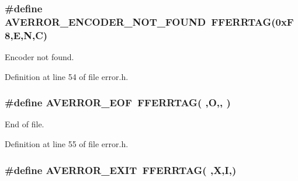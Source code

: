 \subsubsection[{\texorpdfstring{A\+V\+E\+R\+R\+O\+R\+\_\+\+E\+N\+C\+O\+D\+E\+R\+\_\+\+N\+O\+T\+\_\+\+F\+O\+U\+ND}{AVERROR_ENCODER_NOT_FOUND}}]{\setlength{\rightskip}{0pt plus 5cm}\#define A\+V\+E\+R\+R\+O\+R\+\_\+\+E\+N\+C\+O\+D\+E\+R\+\_\+\+N\+O\+T\+\_\+\+F\+O\+U\+ND~{\bf F\+F\+E\+R\+R\+T\+AG}(0x\+F8,\textquotesingle{}\+E\textquotesingle{},\textquotesingle{}\+N\textquotesingle{},\textquotesingle{}\+C\textquotesingle{})}\hypertarget{group__lavu__error_ga3fad023a4fafed6b6ec9148606a61979}{}\label{group__lavu__error_ga3fad023a4fafed6b6ec9148606a61979}


Encoder not found. 



Definition at line 54 of file error.\+h.

\subsubsection[{\texorpdfstring{A\+V\+E\+R\+R\+O\+R\+\_\+\+E\+OF}{AVERROR_EOF}}]{\setlength{\rightskip}{0pt plus 5cm}\#define A\+V\+E\+R\+R\+O\+R\+\_\+\+E\+OF~{\bf F\+F\+E\+R\+R\+T\+AG}( \textquotesingle{},\textquotesingle{}O\textquotesingle{},\textquotesingle{},\textquotesingle{} \textquotesingle{})}\hypertarget{group__lavu__error_gab4faa0afdf35076914824200331defff}{}\label{group__lavu__error_gab4faa0afdf35076914824200331defff}


End of file. 



Definition at line 55 of file error.\+h.

\subsubsection[{\texorpdfstring{A\+V\+E\+R\+R\+O\+R\+\_\+\+E\+X\+IT}{AVERROR_EXIT}}]{\setlength{\rightskip}{0pt plus 5cm}\#define A\+V\+E\+R\+R\+O\+R\+\_\+\+E\+X\+IT~{\bf F\+F\+E\+R\+R\+T\+AG}( \textquotesingle{},\textquotesingle{}X\textquotesingle{},\textquotesingle{}I\textquotesingle{},\textquotesingle{})}\hypertarget{group__lavu__error_ga334ea23fd9e492cd0e718330f2353b6b}{}\label{group__lavu__error_ga334ea23fd9e492cd0e718330f2353b6b}



